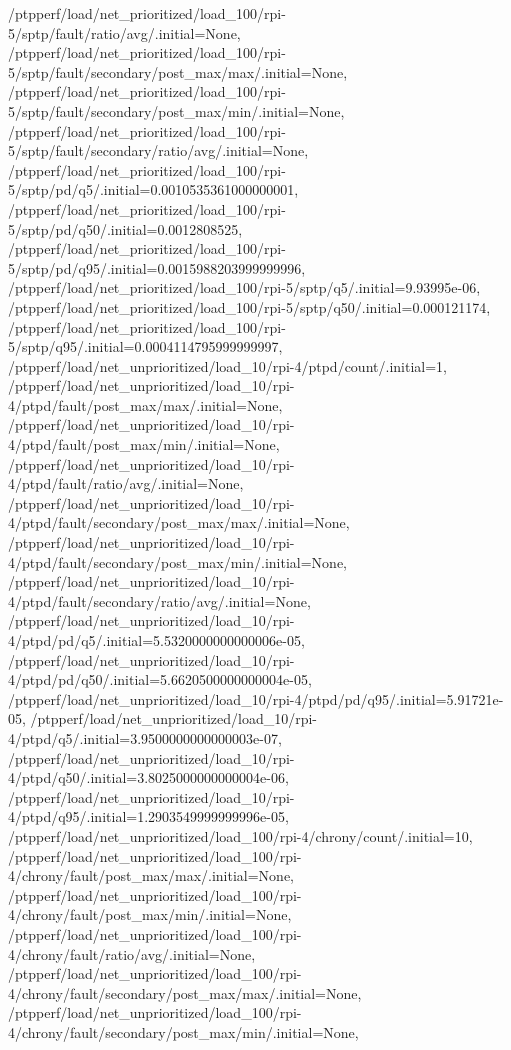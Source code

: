 {    /ptpperf/load/net_prioritized/load_100/rpi-5/sptp/fault/ratio/avg/.initial=None,
    /ptpperf/load/net_prioritized/load_100/rpi-5/sptp/fault/secondary/post_max/max/.initial=None,
    /ptpperf/load/net_prioritized/load_100/rpi-5/sptp/fault/secondary/post_max/min/.initial=None,
    /ptpperf/load/net_prioritized/load_100/rpi-5/sptp/fault/secondary/ratio/avg/.initial=None,
    /ptpperf/load/net_prioritized/load_100/rpi-5/sptp/pd/q5/.initial=0.0010535361000000001,
    /ptpperf/load/net_prioritized/load_100/rpi-5/sptp/pd/q50/.initial=0.0012808525,
    /ptpperf/load/net_prioritized/load_100/rpi-5/sptp/pd/q95/.initial=0.0015988203999999996,
    /ptpperf/load/net_prioritized/load_100/rpi-5/sptp/q5/.initial=9.93995e-06,
    /ptpperf/load/net_prioritized/load_100/rpi-5/sptp/q50/.initial=0.000121174,
    /ptpperf/load/net_prioritized/load_100/rpi-5/sptp/q95/.initial=0.0004114795999999997,
    /ptpperf/load/net_unprioritized/load_10/rpi-4/ptpd/count/.initial=1,
    /ptpperf/load/net_unprioritized/load_10/rpi-4/ptpd/fault/post_max/max/.initial=None,
    /ptpperf/load/net_unprioritized/load_10/rpi-4/ptpd/fault/post_max/min/.initial=None,
    /ptpperf/load/net_unprioritized/load_10/rpi-4/ptpd/fault/ratio/avg/.initial=None,
    /ptpperf/load/net_unprioritized/load_10/rpi-4/ptpd/fault/secondary/post_max/max/.initial=None,
    /ptpperf/load/net_unprioritized/load_10/rpi-4/ptpd/fault/secondary/post_max/min/.initial=None,
    /ptpperf/load/net_unprioritized/load_10/rpi-4/ptpd/fault/secondary/ratio/avg/.initial=None,
    /ptpperf/load/net_unprioritized/load_10/rpi-4/ptpd/pd/q5/.initial=5.5320000000000006e-05,
    /ptpperf/load/net_unprioritized/load_10/rpi-4/ptpd/pd/q50/.initial=5.6620500000000004e-05,
    /ptpperf/load/net_unprioritized/load_10/rpi-4/ptpd/pd/q95/.initial=5.91721e-05,
    /ptpperf/load/net_unprioritized/load_10/rpi-4/ptpd/q5/.initial=3.9500000000000003e-07,
    /ptpperf/load/net_unprioritized/load_10/rpi-4/ptpd/q50/.initial=3.8025000000000004e-06,
    /ptpperf/load/net_unprioritized/load_10/rpi-4/ptpd/q95/.initial=1.2903549999999996e-05,
    /ptpperf/load/net_unprioritized/load_100/rpi-4/chrony/count/.initial=10,
    /ptpperf/load/net_unprioritized/load_100/rpi-4/chrony/fault/post_max/max/.initial=None,
    /ptpperf/load/net_unprioritized/load_100/rpi-4/chrony/fault/post_max/min/.initial=None,
    /ptpperf/load/net_unprioritized/load_100/rpi-4/chrony/fault/ratio/avg/.initial=None,
    /ptpperf/load/net_unprioritized/load_100/rpi-4/chrony/fault/secondary/post_max/max/.initial=None,
    /ptpperf/load/net_unprioritized/load_100/rpi-4/chrony/fault/secondary/post_max/min/.initial=None,
}

